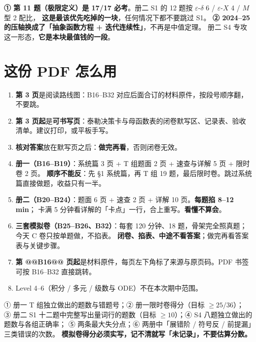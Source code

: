\begin{warnbox}[两条不可破的纪律]
\textbf{① 第 11 题（极限定义）是 17/17 必考}。册二 S1 的 12 题按 \texorpdfstring{$\varepsilon$-$\delta$ 6 / $\varepsilon$-$X$ 4 / $M$ 型 2}{eps-delta 6 / eps-X 4 / M 型 2} 配比，
\textbf{这是最该优先吃掉的一块}，任何情况下都不要跳过 S1。
\textbf{② 2024--25 的压轴换成了「抽象函数方程 + 迭代连续性」}，不再是中值定理。
册二 S4 专攻这一形态，\textbf{它是本块最值钱的一段}。
\end{warnbox}

\section{这份 PDF 怎么用}
\begin{enumerate}
\item \textbf{第 3 页}是阅读路线图：B16--B32 对应后面合订的材料原件，按段号顺序翻，不要跳。
\item \textbf{第 3 页起}是\textbf{可书写页}：泰勒决策卡与母函数表的闭卷默写区、记录表、验收清单。建议打印，或平板手写。
\item \textbf{核对答案}放在默写页之后：\textbf{做完再看}，否则闭卷无效。
\item \textbf{册一（B16--B19）}：系统篇 3 页 + T 组题面 2 页 + 速查与详解 5 页 + 限时卷 2 页。
      \textbf{顺序不能反}：先 §1 系统篇，再 T 组 19 题，最后限时卷。跳过系统篇直接做题，收益只有一半。
\item \textbf{册二（B20--B24）}：题面 6 页 + 速查 2 页 + 详解 10 页。\textbf{每题掐 8--12 min}；
      卡满 5 分钟看详解的「卡点」一行，合上重写。\textbf{看懂不算会}。
\item \textbf{三套模拟卷（B25--B26、B32）}：每套 120 分钟、18 题，骨架完全照真题；今天 C 卷只按单题做，不掐表。
      \textbf{闭卷、掐表、中途不看答案}；做完再看答案表与关键步骤。
\item \textbf{第 @@B16@@ 页起}是材料原件，每页左下角标了来源与原页码。PDF 书签可按 B16--B32 直接跳转。
\item Level 4--6（积分 / 多元 / 级数与 ODE）不在本次期中范围。
\end{enumerate}

\begin{keypoint}[产出（明天的输入）]
① 册一 T 组独立做出的题数与错题号；② 册一限时卷得分（目标 $\geq 25/36$）；
③ 册二 S1 十二题中完整写出量词行的题数（目标 $\geq 10$）；④ S4 八题独立做出的题数与各组正确率；
⑤ 两条最大失分点；⑥ 两册中「展错阶 / 符号反 / 前提漏」三类错误的次数。
\textbf{模拟卷得分必须实写，记不清就写「未记录」，不要估算分数。}
\end{keypoint}
